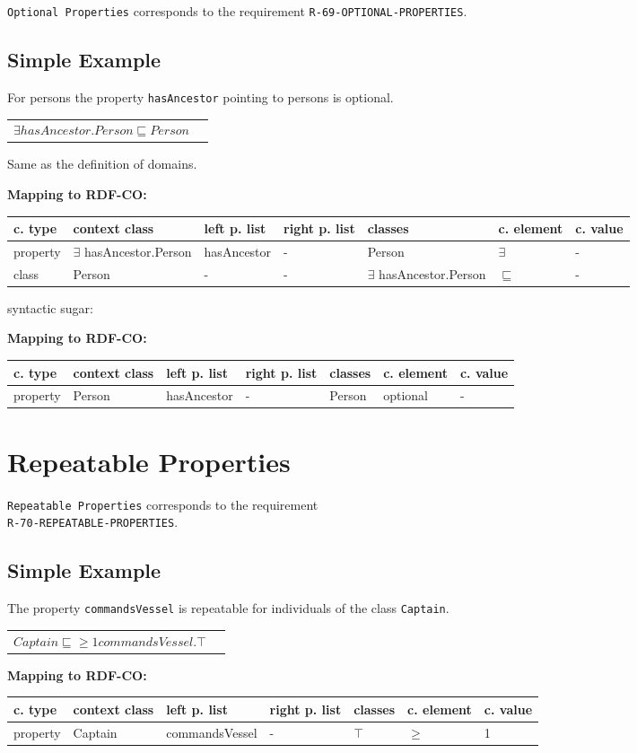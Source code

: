 \documentclass{llncs}
\newcommand{\ms}[1]{\texttt{#1}}
\newenvironment{gcotable}{
  \scriptsize
  \sffamily
  \vspace{0cm}
	\begin{center}
	\textbf{\vspace{0.4cm}Mapping to RDF-CO:} \\
  \begin{tabular}{l|l|l|l|l|l|l}
	\hline
  \textbf{c. type} & \textbf{context class} & \textbf{left p. list} & \textbf{right p. list} & \textbf{classes} & \textbf{c. element} & \textbf{c. value} \\
  \hline

}{
  \hline
  \end{tabular}
	\end{center}
}
\newenvironment{DL}{
  \vspace{0cm}
	\begin{center}
  \begin{tabular}{r l}

}{
  \end{tabular}
	\end{center}
}
\begin{document}
\ms{Optional Properties} corresponds to the requirement \ms{R-69-OPTIONAL-PROPERTIES}.

\subsection{Simple Example}

For persons the property \ms{hasAncestor} pointing to persons is optional.

\begin{DL}
$\exists hasAncestor.Person \sqsubseteq Person$ \\
\end{DL}

Same as the definition of domains.

\begin{gcotable}
property & $\exists$ hasAncestor.Person & hasAncestor & - & Person & $\exists$ & - \\
class & Person & - & - & $\exists$ hasAncestor.Person & $\sqsubseteq$ & - \\
\end{gcotable}	

syntactic sugar:

\begin{gcotable}
property & Person & hasAncestor & - & Person & optional & - \\
\end{gcotable}

\section{Repeatable Properties}

\ms{Repeatable Properties} corresponds to the requirement \\
\ms{R-70-REPEATABLE-PROPERTIES}.

\subsection{Simple Example}

The property \ms{commandsVessel} is repeatable for individuals of the class \ms{Captain}.

\begin{DL}
$Captain \sqsubseteq \geq1 commandsVessel.\top $
\end{DL}

\begin{gcotable}
property & Captain & commandsVessel & - & $\top$ & $\geq$ & 1 \\
\end{gcotable}
\end{document}
